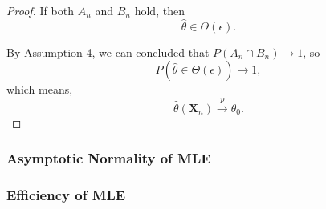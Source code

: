 \begin{proof}
    If both $A_{n}$ and $B_{n}$ hold, then
    \begin{equation*}
        \hat{\theta}\in\Theta(\epsilon).
    \end{equation*}

    By Assumption 4, we can concluded that $P\left(A_{n}\cap B_{n}\right)\rightarrow 1$, so
    \begin{equation*}
        P(\hat{\theta}\in\Theta(\epsilon))\rightarrow 1,
    \end{equation*}
    which means,
    \begin{equation*}
        \hat{\theta}\left(\textbf{X}_{n}\right)\stackrel{p}{\rightarrow}\theta_{0}.
    \end{equation*}
\end{proof}

\subsubsection{Asymptotic Normality of MLE}

\subsubsection{Efficiency of MLE}
